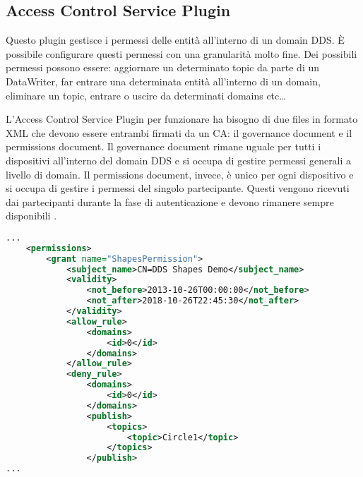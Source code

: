 \subsection{Access Control Service Plugin}

Questo plugin gestisce i permessi delle entità all'interno di 
un domain DDS. È possibile configurare questi permessi con una 
granularità molto fine. Dei possibili permessi possono essere:
aggiornare un determinato topic da parte di 
un DataWriter, far entrare una determinata entità
all'interno di un domain, eliminare un topic, entrare o 
uscire da determinati domains etc\dots

L'Access Control Service Plugin per funzionare ha bisogno di due 
files in formato XML che devono essere entrambi firmati da 
un CA: il governance document e il permissions document.
Il governance document rimane uguale per tutti i dispositivi 
all'interno del domain DDS e si occupa di gestire 
permessi generali a livello di domain. Il permissions document,
invece, è unico per ogni dispositivo e si occupa di gestire i 
permessi del singolo partecipante.
Questi vengono ricevuti dai partecipanti durante la fase di
autenticazione e devono rimanere sempre disponibili \cite{essay93639}.



\vspace{5mm} %
\begin{lstlisting}[language=XML, caption=Estratto di permissions
    document{,} tratto da documento di riferimento 
    del DDS Security versione 1.1 \cite{ddssecurity1.1}.
    , label=XML permission file,
    captionpos=b]
...
    <permissions>
        <grant name="ShapesPermission">
            <subject_name>CN=DDS Shapes Demo</subject_name>
            <validity>
                <not_before>2013-10-26T00:00:00</not_before>
                <not_after>2018-10-26T22:45:30</not_after>
            </validity>
            <allow_rule>
                <domains>
                    <id>0</id>
                </domains>
            </allow_rule>
            <deny_rule>
                <domains>
                    <id>0</id>
                </domains>
                <publish>
                    <topics>
                        <topic>Circle1</topic>
                    </topics>
                </publish>
...
    \end{lstlisting}
\vspace{5mm}
\label{Access Control Service Plugin}

